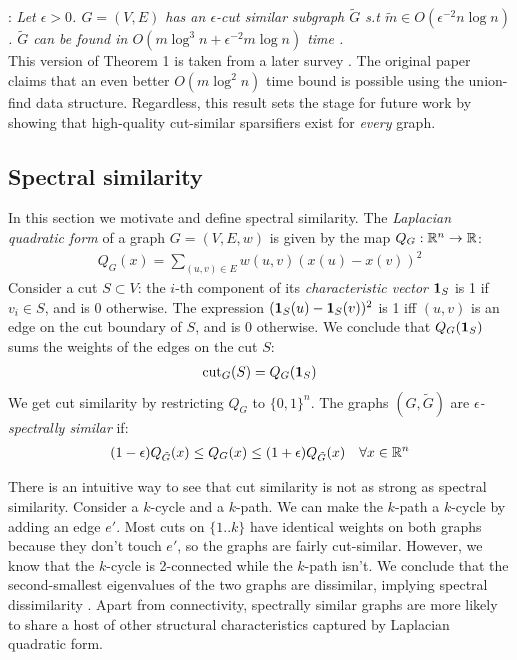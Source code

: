 \documentclass{article}
\begin{document}
\noindent
{}: \textit{Let $\epsilon > 0$. $G =
(V, E)$ has an $\epsilon$-cut similar subgraph $\tilde{G}$ s.t $\tilde{m}
\in O(\epsilon^{-2}n\log n)$. $\tilde{G}$ can be found in $O(m\log^3n +
\epsilon^{-2}m\log n)$ time \cite{BenczurKarger}.} \\

This version of Theorem 1 is taken from a later survey \cite{TheSurvey}. The
original paper claims that an even better $O(m\log^2 n)$ time bound is
possible using the union-find data structure. Regardless, this result sets
the stage for future work by showing that high-quality cut-similar
sparsifiers exist for \textit{every} graph. 

\subsection{Spectral similarity}

In this section we motivate and define spectral similarity. The
\textit{Laplacian quadratic form} of a graph $G = (V, E, w)$ is given by the
map $Q_G : \mathbb{R}^n \rightarrow \mathbb{R}$:
\begin{align*}
    Q_G(x) = \sum_{(u, v) \in E} w(u, v)(x(u) - x(v))^2
\end{align*}
Consider a cut $S \subset V$: the $i$-th component of its
\textit{characteristic vector} $\mathbf{1}_S$ is 1 if $v_i \in S$, and is 0
otherwise. The expression $(\mathbf{1}_S(u) - \mathbf{1}_S(v))^2$ is 1 iff $(u, v)$ is
an edge on the cut boundary of $S$, and is 0 otherwise. We conclude that
$Q_G(\mathbf{1}_S)$ sums the weights of the edges on the cut $S$:
\begin{align*}
    \text{cut}_{G}(S) = Q_G(\mathbf{1}_S)
\end{align*}
We get cut similarity by restricting $Q_G$ to $\{0, 1\}^n$. The graphs $(G,
\tilde{G})$ are \textit{$\epsilon$-spectrally similar} if:
\begin{align*}
    (1 - \epsilon)Q_{\tilde{G}}(x) \leq Q_G(x) \leq (1 +
    \epsilon)Q_{\tilde{G}}(x) \quad \forall{x \in \mathbb{R}^n}
\end{align*}

There is an intuitive way to see that cut similarity is not as strong as
spectral similarity. Consider a $k$-cycle and a $k$-path. We can make the
$k$-path a $k$-cycle by adding an edge $e'$. Most cuts on $\{1..k\}$ have
identical weights on both graphs because they don't touch $e'$, so the
graphs are fairly cut-similar. However, we know that the $k$-cycle is
2-connected while the $k$-path isn't. We conclude that the second-smallest
eigenvalues of the two graphs are dissimilar, implying spectral
dissimilarity \cite{Fiedler}. Apart from connectivity, spectrally similar
graphs are more likely to share a host of other structural characteristics
captured by Laplacian quadratic form.
\end{document}
